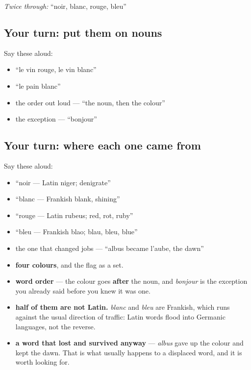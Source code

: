 \emph{Twice through:} \textquotedblleft{}noir, blanc, rouge, bleu\textquotedblright{}

\subsection*{Your turn: put them on nouns}
Say these aloud:

\begin{itemize}
\raggedright
  \item \textquotedblleft{}le vin rouge, le vin blanc\textquotedblright{}
  \item \textquotedblleft{}le pain blanc\textquotedblright{}
  \item the order out loud — \textquotedblleft{}the noun, then the colour\textquotedblright{}
  \item the exception — \textquotedblleft{}bonjour\textquotedblright{}
\end{itemize}

\subsection*{Your turn: where each one came from}
Say these aloud:

\begin{itemize}
\raggedright
  \item \textquotedblleft{}noir — Latin niger; denigrate\textquotedblright{}
  \item \textquotedblleft{}blanc — Frankish blank, shining\textquotedblright{}
  \item \textquotedblleft{}rouge — Latin rubeus; red, rot, ruby\textquotedblright{}
  \item \textquotedblleft{}bleu — Frankish blao; blau, bleu, blue\textquotedblright{}
  \item the one that changed jobs — \textquotedblleft{}albus became l'aube, the dawn\textquotedblright{}
\end{itemize}

\begin{grammarlens}[title={What you've built this chapter}]
\begin{itemize}
\raggedright
  \item \textbf{four colours}, and the flag as a set.
  \item \textbf{word order} — the colour goes \textbf{after} the noun, and \emph{bonjour} is the exception you already said before you knew it was one.
  \item \textbf{half of them are not Latin.} \emph{blanc} and \emph{bleu} are Frankish, which runs against the usual direction of traffic: Latin words flood into Germanic languages, not the reverse.
  \item \textbf{a word that lost and survived anyway} — \emph{albus} gave up the colour and kept the dawn. That is what usually happens to a displaced word, and it is worth looking for.
\end{itemize}
\end{grammarlens}

